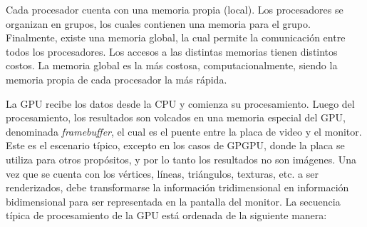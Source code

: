 Cada procesador cuenta con una memoria propia (local).
Los procesadores se organizan en grupos, los cuales contienen una memoria para el grupo.
Finalmente, existe una memoria global, la cual permite la comunicación entre todos los procesadores.
Los accesos a las distintas memorias tienen distintos costos.
La memoria global es la más costosa, computacionalmente, siendo la memoria propia de cada procesador la más rápida.

La GPU recibe los datos desde la CPU y comienza su procesamiento.
Luego del procesamiento, los resultados son volcados en una memoria especial del GPU, denominada {\em framebuffer}, el cual es el puente entre la placa de video y el monitor.
Este es el escenario típico, excepto en los casos de GPGPU, donde la placa se utiliza para otros propósitos, y por lo tanto los resultados no son imágenes.
Una vez que se cuenta con los vértices, líneas, triángulos, texturas, etc. a ser renderizados, debe transformarse la información tridimensional en información bidimensional para ser representada en la pantalla del monitor.
La secuencia t\'ipica de procesamiento de la GPU est\'a ordenada de la siguiente manera:
